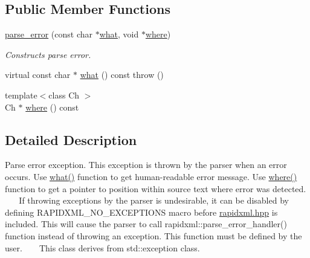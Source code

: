 \subsection*{Public Member Functions}
\begin{DoxyCompactItemize}
\item 
\mbox{\label{classrapidxml_1_1parse__error_aea12a301271c393fb627b368fb9f35c1}} 
\hyperlink{classrapidxml_1_1parse__error_aea12a301271c393fb627b368fb9f35c1}{parse\+\_\+error} (const char $\ast$\hyperlink{classrapidxml_1_1parse__error_a986003116ebcb49a69a20228da306232}{what}, void $\ast$\hyperlink{classrapidxml_1_1parse__error_ab139528f4d9e960f0ee807d22d6c032d}{where})
\begin{DoxyCompactList}\small\item\em Constructs parse error. \end{DoxyCompactList}\item 
virtual const char $\ast$ \hyperlink{classrapidxml_1_1parse__error_a986003116ebcb49a69a20228da306232}{what} () const  throw ()
\item 
{\footnotesize template$<$class Ch $>$ }\\Ch $\ast$ \hyperlink{classrapidxml_1_1parse__error_ab139528f4d9e960f0ee807d22d6c032d}{where} () const
\end{DoxyCompactItemize}


\subsection{Detailed Description}
Parse error exception. This exception is thrown by the parser when an error occurs. Use \hyperlink{classrapidxml_1_1parse__error_a986003116ebcb49a69a20228da306232}{what()} function to get human-\/readable error message. Use \hyperlink{classrapidxml_1_1parse__error_ab139528f4d9e960f0ee807d22d6c032d}{where()} function to get a pointer to position within source text where error was detected. ~\newline
~\newline
 If throwing exceptions by the parser is undesirable, it can be disabled by defining R\+A\+P\+I\+D\+X\+M\+L\+\_\+\+N\+O\+\_\+\+E\+X\+C\+E\+P\+T\+I\+O\+NS macro before \hyperlink{rapidxml_8hpp}{rapidxml.\+hpp} is included. This will cause the parser to call rapidxml\+::parse\+\_\+error\+\_\+handler() function instead of throwing an exception. This function must be defined by the user. ~\newline
~\newline
 This class derives from {\ttfamily std\+::exception} class. 

